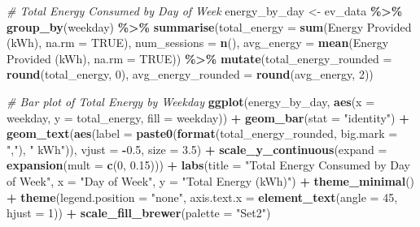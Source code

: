 \documentclass[
  12pt,
]{article}
\newenvironment{Shaded}{\begin{snugshade}}{\end{snugshade}}
\newcommand{\AttributeTok}[1]{\textcolor[rgb]{0.13,0.29,0.53}{#1}}
\newcommand{\CommentTok}[1]{\textcolor[rgb]{0.56,0.35,0.01}{\textit{#1}}}
\newcommand{\ConstantTok}[1]{\textcolor[rgb]{0.56,0.35,0.01}{#1}}
\newcommand{\DecValTok}[1]{\textcolor[rgb]{0.00,0.00,0.81}{#1}}
\newcommand{\FloatTok}[1]{\textcolor[rgb]{0.00,0.00,0.81}{#1}}
\newcommand{\FunctionTok}[1]{\textcolor[rgb]{0.13,0.29,0.53}{\textbf{#1}}}
\newcommand{\NormalTok}[1]{#1}
\newcommand{\OtherTok}[1]{\textcolor[rgb]{0.56,0.35,0.01}{#1}}
\newcommand{\SpecialCharTok}[1]{\textcolor[rgb]{0.81,0.36,0.00}{\textbf{#1}}}
\newcommand{\StringTok}[1]{\textcolor[rgb]{0.31,0.60,0.02}{#1}}
\begin{document}
\begin{Shaded}
\begin{Highlighting}[]
\CommentTok{\# Total Energy Consumed by Day of Week}
\NormalTok{energy\_by\_day }\OtherTok{\textless{}{-}}\NormalTok{ ev\_data }\SpecialCharTok{\%\textgreater{}\%}
    \FunctionTok{group\_by}\NormalTok{(weekday) }\SpecialCharTok{\%\textgreater{}\%}
    \FunctionTok{summarise}\NormalTok{(}\AttributeTok{total\_energy =} \FunctionTok{sum}\NormalTok{(}\StringTok{\textasciigrave{}}\AttributeTok{Energy Provided (kWh)}\StringTok{\textasciigrave{}}\NormalTok{, }\AttributeTok{na.rm =} \ConstantTok{TRUE}\NormalTok{),}
        \AttributeTok{num\_sessions =} \FunctionTok{n}\NormalTok{(), }\AttributeTok{avg\_energy =} \FunctionTok{mean}\NormalTok{(}\StringTok{\textasciigrave{}}\AttributeTok{Energy Provided (kWh)}\StringTok{\textasciigrave{}}\NormalTok{,}
            \AttributeTok{na.rm =} \ConstantTok{TRUE}\NormalTok{)) }\SpecialCharTok{\%\textgreater{}\%}
    \FunctionTok{mutate}\NormalTok{(}\AttributeTok{total\_energy\_rounded =} \FunctionTok{round}\NormalTok{(total\_energy, }\DecValTok{0}\NormalTok{), }\AttributeTok{avg\_energy\_rounded =} \FunctionTok{round}\NormalTok{(avg\_energy,}
        \DecValTok{2}\NormalTok{))}

\CommentTok{\# Bar plot of Total Energy by Weekday}
\FunctionTok{ggplot}\NormalTok{(energy\_by\_day, }\FunctionTok{aes}\NormalTok{(}\AttributeTok{x =}\NormalTok{ weekday, }\AttributeTok{y =}\NormalTok{ total\_energy, }\AttributeTok{fill =}\NormalTok{ weekday)) }\SpecialCharTok{+}
    \FunctionTok{geom\_bar}\NormalTok{(}\AttributeTok{stat =} \StringTok{"identity"}\NormalTok{) }\SpecialCharTok{+} \FunctionTok{geom\_text}\NormalTok{(}\FunctionTok{aes}\NormalTok{(}\AttributeTok{label =} \FunctionTok{paste0}\NormalTok{(}\FunctionTok{format}\NormalTok{(total\_energy\_rounded,}
    \AttributeTok{big.mark =} \StringTok{","}\NormalTok{), }\StringTok{" kWh"}\NormalTok{)), }\AttributeTok{vjust =} \SpecialCharTok{{-}}\FloatTok{0.5}\NormalTok{, }\AttributeTok{size =} \FloatTok{3.5}\NormalTok{) }\SpecialCharTok{+} \FunctionTok{scale\_y\_continuous}\NormalTok{(}\AttributeTok{expand =} \FunctionTok{expansion}\NormalTok{(}\AttributeTok{mult =} \FunctionTok{c}\NormalTok{(}\DecValTok{0}\NormalTok{,}
    \FloatTok{0.15}\NormalTok{))) }\SpecialCharTok{+} \FunctionTok{labs}\NormalTok{(}\AttributeTok{title =} \StringTok{"Total Energy Consumed by Day of Week"}\NormalTok{,}
    \AttributeTok{x =} \StringTok{"Day of Week"}\NormalTok{, }\AttributeTok{y =} \StringTok{"Total Energy (kWh)"}\NormalTok{) }\SpecialCharTok{+} \FunctionTok{theme\_minimal}\NormalTok{() }\SpecialCharTok{+}
    \FunctionTok{theme}\NormalTok{(}\AttributeTok{legend.position =} \StringTok{"none"}\NormalTok{, }\AttributeTok{axis.text.x =} \FunctionTok{element\_text}\NormalTok{(}\AttributeTok{angle =} \DecValTok{45}\NormalTok{,}
        \AttributeTok{hjust =} \DecValTok{1}\NormalTok{)) }\SpecialCharTok{+} \FunctionTok{scale\_fill\_brewer}\NormalTok{(}\AttributeTok{palette =} \StringTok{"Set2"}\NormalTok{)}
\end{Highlighting}
\end{Shaded}
\end{document}
